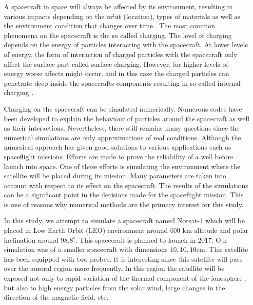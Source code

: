 

A spacecraft in space will always be affected by its environment, resulting in various
impacts depending on the orbit (location), types of materials as well as the environment
condition that changes over time \citep{trove.nla.gov.au/work/21680840}. The  most common phenomena on the spacecraft is the so
called charging. The level of charging depends on the energy of particles interacting with
the spacecraft. At lower levels of energy, the form of interaction of charged particles with the
spacecraft only affect the surface part called surface charging. However, for higher levels of energy
worse affects might occur, and in this case the charged particles
can penetrate deep inside the spacecrafts components resulting in so called internal charging \citep{fennell2001spacecraft}.

Charging on the spacecraft can be simulated numerically. Numerous codes have been developed
to explain the behaviour of particles around the spacecraft as well as their interactions.
Nevertheless, there still remains many questions since the numerical simulations are only approximations
of real conditions. Although the numerical approach has given good solutions to various applications
such as spaceflight missions. Efforts are made to prove the reliability of a well before launch into space.
One of these efforts is simulating the environment where the satellite will be placed during its mission.
Many parameters are taken into account with respect to its effect on the spacecraft.
The results of the simulations can be a significant point in the decisions made for the spaceflight
mission. This is one of reasons why numerical methods are the primary interest for this study.

In this study, we attempt to simulate a spacecraft named Norsat-1 which will be placed in
Low Earth Orbit (LEO) environment around \(600\) km altitude and polar inclination around \(98.8^\circ\).
This spacecraft is planned to launch in \(2017\)\citep{norSat}. Our simulation was of a smaller spacecraft with dimensions
\(10,10,10\)cm.
This satellite
has been equipped with two probes. It is interesting since this satellite will pass over
the auroral region more frequently. In this region  the satellite will be exposed not only to
rapid variation of the thermal component of the ionosphere \citep{hastings1995review}, but also to high
energy particles from the solar wind, large changes in the direction of the magnetic field, etc.

